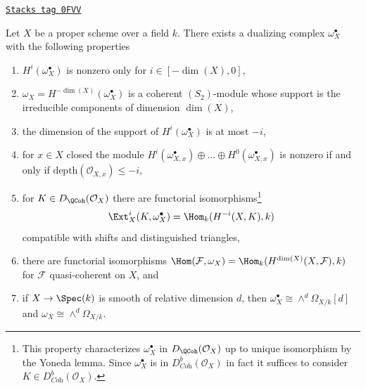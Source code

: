 \begin{lemma}
\label{duality-lemma-duality-proper-over-field}
\href{https://stacks.math.columbia.edu/tag/0FVV}{\texttt{Stacks tag 0FVV}}

Let $X$ be a proper scheme over a field $k$. There exists a dualizing complex
$\omega_X^\bullet$ with the following properties
\begin{enumerate}
\item $H^i(\omega_X^\bullet)$ is nonzero only for $i \in [-\dim(X), 0]$,
\item $\omega_X = H^{-\dim(X)}(\omega_X^\bullet)$ is a coherent
$(S_2)$-module whose support is the irreducible components
of dimension $\dim(X)$,
\item the dimension of the support of $H^i(\omega_X^\bullet)$ is at most $-i$,
\item for $x \in X$ closed the module
$H^i(\omega_{X, x}^\bullet) \oplus \ldots \oplus H^0(\omega_{X, x}^\bullet)$
is nonzero if and only if $\text{depth}(\mathcal{O}_{X, x}) \leq -i$,
\item for $K \in D_\QCoh(\mathcal{O}_X)$ there are functorial
isomorphisms\footnote{This property
characterizes $\omega_X^\bullet$ in $D_\QCoh(\mathcal{O}_X)$
up to unique isomorphism by the Yoneda lemma. Since $\omega_X^\bullet$
is in $D^b_{\textit{Coh}}(\mathcal{O}_X)$ in fact it suffices to consider
$K \in D^b_{\textit{Coh}}(\mathcal{O}_X)$.}
$$
\Ext^i_X(K, \omega_X^\bullet) = \Hom_k(H^{-i}(X, K), k)
$$
compatible with shifts and distinguished triangles,
\item there are functorial isomorphisms
$\Hom(\mathcal{F}, \omega_X) = \Hom_k(H^{\dim(X)}(X, \mathcal{F}), k)$
for $\mathcal{F}$ quasi-coherent on $X$, and
\item if $X \to \Spec(k)$ is smooth of relative dimension $d$,
then $\omega_X^\bullet \cong \wedge^d\Omega_{X/k}[d]$ and
$\omega_X \cong \wedge^d\Omega_{X/k}$.
\end{enumerate}
\end{lemma}

